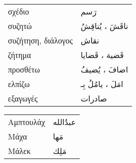 \documentclass[twocolumn,a4paper]{article}
\newcommand{\ar}[1]{\textarabic{#1}}
\newcommand{\pl}{\raisebox{0.15ex}{\footnotesize ◍}}
\newcommand{\vrf}{\raisebox{0.15ex}{\footnotesize ◉}}
\newcommand{\mas}{\raisebox{0.15ex}{\footnotesize ◫}}
\begin{document}
\begin{mpsupertabular}{ P{0.5\textwidth} P{0.5\textwidth} }
σχέδιο                       & \ar{ رَسم } \\
συζητώ \vrf                  & \ar{ ناقَشَ ، يُناقِشُ } \\
συζήτηση, διάλογος \mas      & \ar{ نقاش } \\ %
ζήτημα  \pl                  & \ar{ قَضية ، قَضايا } \\
προσθέτω \vrf                & \ar{ اضافَ ، يُضيفُ } \\
ελπίζω \vrf                  & \ar{ امَلَ ، يامُلُ بِـ } \\
εξαγωγές                     & \ar{ صادرات } \\


\end{mpsupertabular}


\clearpage

\begin{mpsupertabular}{ P{0.5\textwidth} P{0.5\textwidth} }
Αμπτουλάχ          & \ar{ عبدُالله } \\
Μάχα               & \ar{ مَها } \\
Μάλεκ              & \ar{ مَلِك } \\
\end{mpsupertabular}

\clearpage
\end{document}
